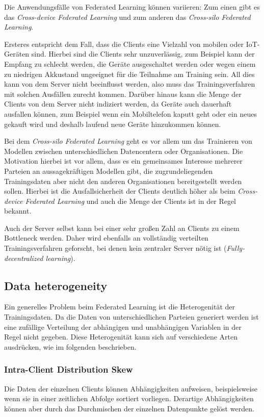 Die Anwendungsfälle von Federated Learning können variieren: Zum einen gibt es das \textit{Cross-device Federated Learning} und zum anderen das \textit{Cross-silo Federated Learning}\cite{kairouz:2021}. 

Ersteres entspricht dem Fall, dass die Clients eine Vielzahl von mobilen oder IoT-Geräten sind. Hierbei sind die Clients sehr unzuverlässig, zum Beispiel kann der Empfang zu schlecht werden, die Geräte ausgeschaltet werden oder wegen einem zu niedrigen Akkustand ungeeignet für die Teilnahme am Training sein. All dies kann von dem Server nicht beeinflusst werden, also muss das Trainingsverfahren mit solchen Ausfällen zurecht kommen. Darüber hinaus kann die Menge der Clients von dem Server nicht indiziert werden, da Geräte auch dauerhaft ausfallen können, zum Beispiel wenn ein Mobiltelefon kaputt geht oder ein neues gekauft wird und deshalb laufend neue Geräte hinzukommen können.

Bei dem \textit{Cross-silo Federated Learning} geht es vor allem um das Trainieren von Modellen zwischen unterschiedlichen Datencentern oder Organisationen. Die Motivation hierbei ist vor allem, dass es ein gemeinsames Interesse mehrerer Parteien an aussagekräftigen Modellen gibt, die zugrundeliegenden Trainingsdaten aber nicht den anderen Organisationen bereitgestellt werden sollen. Hierbei ist die Ausfallsicherheit der Clients deutlich höher als beim \textit{Cross-device Federated Learning} und auch die Menge der Clients ist in der Regel bekannt.

Auch der Server selbst kann bei einer sehr großen Zahl an Clients zu einem Bottleneck werden.\cite[p.11]{kairouz:2021} Daher wird ebenfalls an vollständig verteilten Trainingsverfahren geforscht, bei denen kein zentraler Server nötig ist (\textit{Fully-decentralized learning}).

\subsection{Data heterogeneity}

Ein generelles Problem beim Federated Learning ist die Heterogenität der Trainingsdaten. Da die Daten von unterschiedlichen Parteien generiert werden ist eine zufällige Verteilung der abhängigen und unabhängigen Variablen in der Regel nicht gegeben. Diese Heterogenität kann sich auf verschiedene Arten ausdrücken, wie im folgenden beschrieben.

\subsubsection{Intra-Client Distribution Skew}
Die Daten der einzelnen Clients können Abhängigkeiten aufweisen, beispielsweise wenn sie in einer zeitlichen Abfolge sortiert vorliegen. Derartige Abhängigkeiten können aber durch das Durchmischen der einzelnen Datenpunkte gelöst werden.

